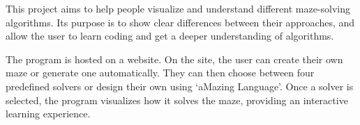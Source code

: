 This project aims to help people visualize and understand different maze-solving algorithms. Its purpose is to show clear differences between their approaches, and allow the user to learn coding and get a deeper understanding of algorithms.

The program is hosted on a website. On the site, the user can create their own maze or generate one automatically. They can then choose between four predefined solvers or design their own using ‘aMazing Language’. Once a solver is selected, the program visualizes how it solves the maze, providing an interactive learning experience.
